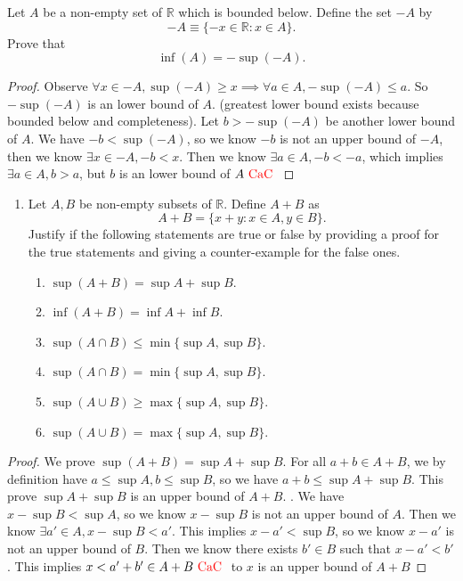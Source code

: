 \documentclass{report}
\begin{document}
\begin{question}{}{}
Let \( A \) be a non-empty set of \( \mathbb{R} \) which is bounded below. Define the set \( -A \) by 
\[ -A \equiv \{-x \in \mathbb{R} : x \in A\}. \]
Prove that
\[ \inf(A) = -\sup(-A). \]
\end{question}
\begin{proof}
Observe $\forall x\in -A, \sup (-A)\geq  x\implies \forall a \in A, -\sup (-A)\leq  a$. So $-\sup (-A)$ is an lower bound of $A$.  (greatest lower bound exists because bounded below and completeness). Let $b>-\sup (-A)$ be another lower bound of $A$. We have $-b<\sup (-A)$, so we know $-b$ is not an upper bound of $-A$, then we know  $\exists x \in -A, -b<x$. Then we know $\exists a \in A, -b<-a$, which implies $\exists a \in A, b>a$, but $b$ is an lower bound of $A\text{ \textcolor{red}{CaC} }$
\end{proof}
\begin{question}{}{}
\begin{enumerate}
    \item Let \( A, B \) be non-empty subsets of \( \mathbb{R} \). Define \( A+B \) as 
    \[ A+B = \{ x+y : x \in A, y \in B \}. \]
    Justify if the following statements are true or false by providing a proof for the true statements and giving a counter-example for the false ones.
    \begin{enumerate}
        \item \( \sup(A+B) = \sup A + \sup B \).
        \item \( \inf(A+B) = \inf A + \inf B \).
        \item \( \sup(A \cap B) \leq \min\{\sup A, \sup B\} \).
        \item \( \sup(A \cap B) = \min\{\sup A, \sup B\} \).
        \item \( \sup(A \cup B) \geq \max\{\sup A, \sup B\} \).
        \item \( \sup(A \cup B) = \max\{\sup A, \sup B\} \).
    \end{enumerate}
\end{enumerate}
\end{question}
\begin{proof}
We prove $\sup (A+B)=\sup A+\sup B$. For all $a+b \in A+B$, we by definition have $a\leq \sup A, b\leq \sup B$, so we have $a+b\leq \sup A+\sup B$. This prove $\sup A+\sup B$ is an upper bound of $A+B$. . We have $x-\sup B<\sup A$, so we know $x-\sup B$ is not an upper bound of $A$. Then we know  $\exists a'\in A, x-\sup B<a'$. This implies $x-a'< \sup B$, so we know $x-a'$ is not an upper bound of  $B$. Then we know there exists  $b' \in B$ such that $x-a'< b'$. This implies $x<a'+b' \in A+B\text{ \textcolor{red}{CaC} }$ to $x$ is an upper bound of  $A+B$
\end{proof}
\end{document}

